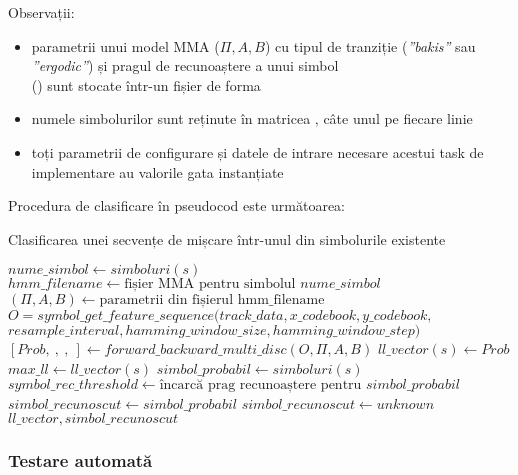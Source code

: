 \documentclass[12pt]{article}
\begin{document}
Observații:
\begin{itemize}
	\justifying
	\item parametrii unui model MMA ($\Pi, A, B$) cu tipul de tranziție  (\emph{''bakis''} sau 	\emph{''ergodic''}) și pragul de recunoaștere a unui simbol\\%
	() sunt stocate într-un fișier 
	de forma\\%
	\item numele simbolurilor sunt reținute în matricea , câte unul pe fiecare linie
	\item toți parametrii de configurare și datele de intrare necesare acestui task de implementare au valorile gata 
	instanțiate
\end{itemize}
Procedura de clasificare în pseudocod este următoarea:
\begin{algorithm}[H]
  \caption{Clasificarea unei secvențe de mișcare într-unul din simbolurile existente}
  \label{alg:alexclasifica}
  \begin{algorithmic}[2]
    	\STATE $nume\_simbol \leftarrow simboluri(s)$
    	\STATE $hmm\_filename \leftarrow \mbox{fișier MMA pentru simbolul } nume\_simbol$
    	\STATE $(\Pi, A, B) \leftarrow \mbox{parametrii din fișierul hmm\_filename}$
		\STATE{}    	
    	\STATE $O = symbol\_get\_feature\_sequence(track\_data, x\_codebook, y\_codebook,$\\$resample\_interval, hamming\_window\_size, hamming\_window\_step)$
    	\STATE{}
    	\STATE $[Prob, ~, ~, ~] \leftarrow forward\_backward\_multi\_disc(O, \Pi, A, B)$
    	\STATE $ll\_vector(s) \leftarrow Prob$
    		\STATE $max\_ll \leftarrow ll\_vector(s)$
    		\STATE $simbol\_probabil \leftarrow simboluri(s)$
    	\ENDIF
    \ENDFOR
    \STATE{} 
    \STATE $symbol\_rec\_threshold \leftarrow \mbox{încarcă prag recunoaștere pentru } simbol\_probabil$
    	\STATE $simbol\_recunoscut \leftarrow simbol\_probabil$
    \ELSE
    	\STATE $simbol\_recunoscut \leftarrow unknown$
    \ENDIF
    \RETURN $ll\_vector, simbol\_recunoscut$
  \end{algorithmic} 
\end{algorithm}

\subsubsection{Testare automată}
\label{sec:testare-ultima}
\end{document}
